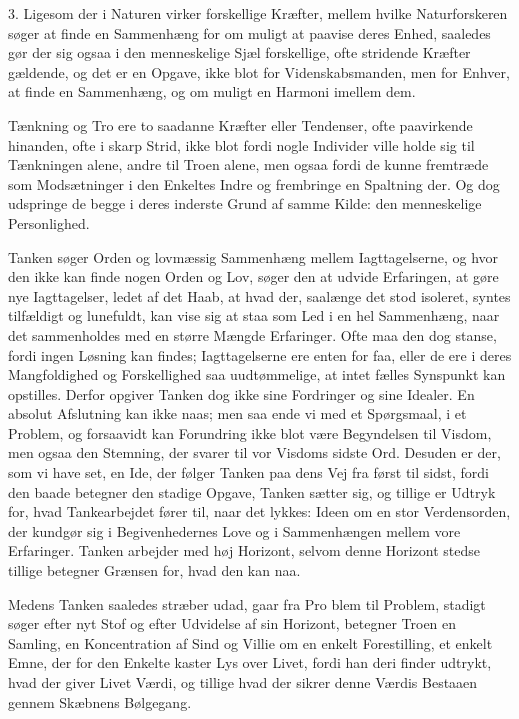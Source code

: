 \documentclass[12pt,a4paper]{article}
\newcommand{\opage}[1]{\marginnote{\footnotesize\textit{[#1]}}}
\begin{document}
\medskip

3. Ligesom der i Naturen virker forskellige Kræfter, mellem hvilke
Naturforskeren søger at finde en Sammenhæng for om muligt at paavise deres
Enhed, saaledes gør der sig ogsaa i den menneskelige Sjæl forskellige, ofte
stridende Kræfter gældende, og det er en Opgave, ikke blot for
Videnskabsmanden, men for Enhver, at \opage{36} finde en Sammenhæng, og om muligt en
Harmoni imellem dem.

Tænkning og Tro ere to saadanne Kræfter eller Tendenser, ofte paavirkende
hinanden, ofte i skarp Strid, ikke blot fordi nogle Individer ville holde sig
til Tænkningen alene, andre til Troen alene, men ogsaa fordi de kunne
fremtræde som Modsætninger i den Enkeltes Indre og frembringe en Spaltning
der. Og dog udspringe de begge i deres inderste Grund af samme Kilde: den
menneskelige Personlighed.

Tanken søger Orden og lovmæssig Sammenhæng mellem Iagttagelserne, og hvor den
ikke kan finde nogen Orden og Lov, søger den at udvide Erfaringen, at gøre
nye Iagttagelser, ledet af det Haab, at hvad der, saalænge det stod isoleret,
syntes tilfældigt og lunefuldt, kan vise sig at staa som Led i en hel
Sammenhæng, naar det sammenholdes med en større Mængde Erfaringer. Ofte maa
den dog stanse, fordi ingen Løsning kan findes; Iagttagelserne ere enten for
faa, eller de ere i deres Mangfoldighed og Forskellighed saa uudtømmelige, at
intet fælles Synspunkt kan opstilles. Derfor opgiver Tanken dog ikke sine
Fordringer og sine Idealer. En absolut Afslutning kan ikke naas; men saa ende
vi med et Spørgsmaal, i et Problem, og forsaavidt kan Forundring ikke blot
være Begyndelsen til Visdom, men ogsaa den Stemning, der svarer til vor
Visdoms sidste Ord. Desuden er der, som vi have set, en Ide, der følger
Tanken paa dens Vej fra først til sidst, fordi den baade betegner den stadige
Opgave, Tanken sætter sig, og tillige er Udtryk for, hvad Tankearbejdet fører
til, naar det lykkes: Ideen om en stor Verdensorden, der kundgør sig i
Begivenhedernes Love og i Sammenhængen mellem vore Erfaringer. Tanken
arbejder med høj Horizont, selvom denne Horizont stedse tillige betegner
Grænsen for, hvad den kan naa.

Medens Tanken saaledes stræber udad, gaar fra Pro%
\opage{37}blem til Problem, stadigt
søger efter nyt Stof og efter Udvidelse af sin Horizont, betegner Troen en
Samling, en Koncentration af Sind og Villie om en enkelt Forestilling, et
enkelt Emne, der for den Enkelte kaster Lys over Livet, fordi han deri finder
udtrykt, hvad der giver Livet Værdi, og tillige hvad der sikrer denne Værdis
Bestaaen gennem Skæbnens Bølgegang.
\end{document}
